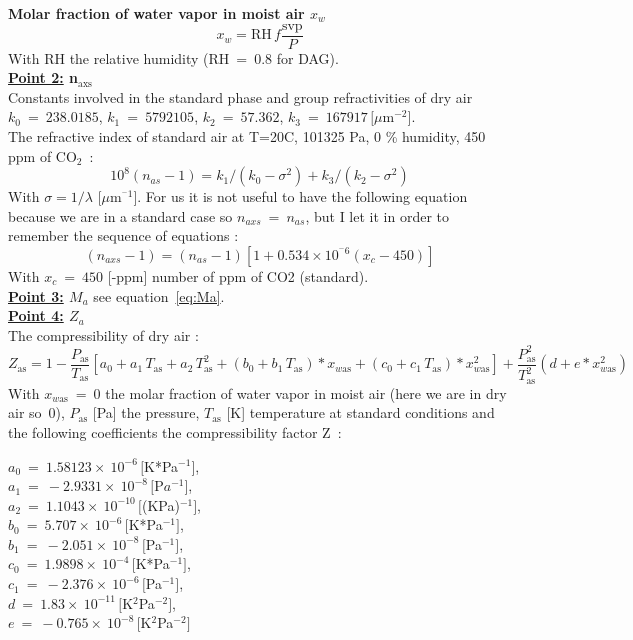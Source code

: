 \textbf{Molar fraction of water vapor in moist air $x_w$}\\
\begin{equation}
	x_w = \text{RH}\,f\frac{\text{svp}}{P} 
\end{equation}
With RH the relative humidity (RH~=~0.8 for DAG).\\

\textbf{\underline{Point 2:} n$_\text{axs}$}\\
Constants involved in the standard phase and group refractivities of dry air $k_0~=~238.0185$, $k_1~=~5792105$, $k_2~=~57.362$, $k_3~=~167917\,[\mu $m$^{-2}]$.\\
The refractive index of standard air at T=20\degree C, 101325 Pa, 0 \% humidity, 450 ppm of CO$_2$~:
\begin{equation}
	10^8 \left(n_{as}-1\right) = k_1/\left(k_0-\sigma ^2\right)+k_3/\left(k_2-\sigma ^2\right)\label{eq:naxs}
\end{equation}
With $\sigma  = 1/\lambda\,\,[\mu $m$^{^-1}]$. 
For us it is not useful to have the following equation because we are in a standard case so $n_{axs}~=~n_{as}$, but I let it in order to remember the sequence of equations :
\begin{equation}
	\left(n_{axs}-1\right) = \left(n_{as}-1\right) \left[1+0.534\times 10^{^-6}\left(x_c-450\right)\right] \label{eq:nasx}
\end{equation}
With $x_c~=~450$ [-ppm] number of ppm of CO2 (standard).\\

\textbf{\underline{Point 3:} $M_a$} see equation~\eqref{eq:Ma}.\\


\textbf{\underline{Point 4:} $Z_a$}\\
The compressibility of dry air :
\begin{equation}
	Z_\text{as} = 1-\frac{P_\text{as}}{T_\text{as}}\left[a_0+a_1\,T_\text{as}+a_2\,T_\text{as}^2+\left(b_0+b_1\,T_\text{as}\right)*x_{w\text{as}} +(c_0+c_1\,T_\text{as})*x_{w\text{as}}^2\right] +\frac{P_\text{as}^2}{T_\text{as}^2}\left(d+e*x_{w\text{as}}^2\right)\label{eq:Za}
\end{equation}
With $x_{w\text{as}}~=~0$ the molar fraction of water vapor in moist air (here we are in dry air so~0), $P_\text{as}$ [Pa] the pressure, $T_\text{as}$ [K] temperature at standard conditions and the following coefficients the compressibility factor Z~: 
\begin{multicols}{3}
$a_0~=~1.58123\times~10^{-6}\,[$K*Pa$^{-1}]$,\\
$a_1~=~-2.9331\times~10^{-8}\,[$P$a^{-1}]$,\\
$a_2~=~1.1043\times~10^{-10}\,[$(KPa)$^{-1}]$,\\
$b_0~=~5.707\times~10^{-6}\,[$K*Pa$^{-1}]$,\\
$b_1~=~-2.051\times~10^{-8}\,[$Pa$^{-1}]$,\\
$c_0~=~1.9898\times~10^{-4}\,[$K*Pa$^{-1}]$,\\
$c_1~=~-2.376\times~10^{-6}\,[$Pa$^{-1}]$,\\
$d~=~1.83\times~10^{-11}\,[$K$^2$Pa$^{-2}]$,\\
$e~=~-0.765\times~10^{-8}\,[$K$^2$Pa$^{-2}]$
\end{multicols}

